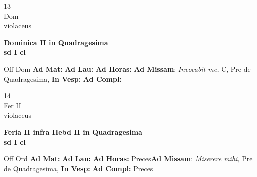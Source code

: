 \documentclass[10pt, openany]{book}
\begin{document}
        \begin{center}
            \begin{minipage}{3.5in}
                \vspace{2em}
                \begin{minipage}{0.5in}
                    {\Huge 13} \\
                    {\normalsize Dom} \\
                    {\normalsize violaceus}
                \end{minipage}
                \begin{minipage}{3.0in}
                    \textbf{ \large Dominica II in Quadragesima \\
                    \textnormal{\normalsize sd I cl}} \\ 
                \end{minipage}
                \begin{justify}Off Dom
                    \textbf{Ad Mat: }
                    \textbf{Ad Lau: }
                    \textbf{Ad Horas: }\textbf{Ad Missam}: \textit{Invocabit me,} C, Pre de Quadragesima,  
                    \textbf{In Vesp: }
                    \textbf{Ad Compl: }
                \end{justify}
            \end{minipage}
        \end{center}
    
        \begin{center}
            \begin{minipage}{3.5in}
                \vspace{2em}
                \begin{minipage}{0.5in}
                    {\Huge 14} \\
                    {\normalsize Fer II} \\
                    {\normalsize violaceus}
                \end{minipage}
                \begin{minipage}{3.0in}
                    \textbf{ \large Feria II infra Hebd II in Quadragesima \\
                    \textnormal{\normalsize sd I cl}} \\ 
                \end{minipage}
                \begin{justify}Off Ord
                    \textbf{Ad Mat: }
                    \textbf{Ad Lau: }
                    \textbf{Ad Horas: }Preces\textbf{Ad Missam}: \textit{Miserere mihi,} Pre de Quadragesima,  
                    \textbf{In Vesp: }
                    \textbf{Ad Compl: }Preces
                \end{justify}
            \end{minipage}
        \end{center}
    
\end{document}
